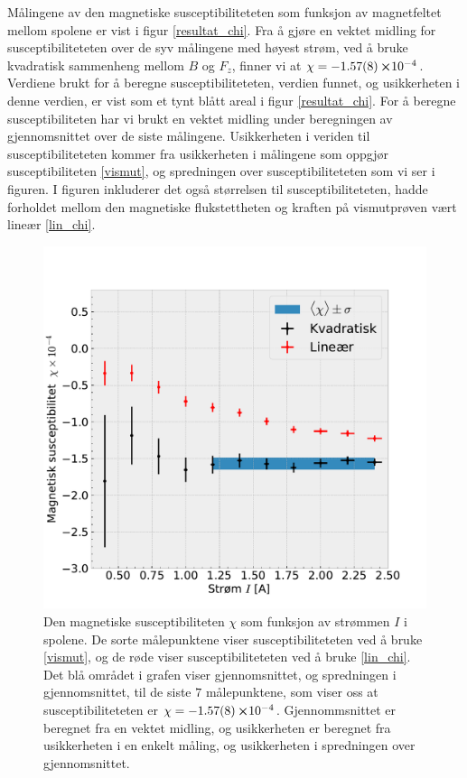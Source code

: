 \documentclass[%
 reprint,
 amsmath,amssymb,
 aps,
 norsk,
]{revtex4-1}
\begin{document}
Målingene av den magnetiske susceptibiliteteten som funksjon av magnetfeltet mellom spolene er vist i figur \vref{resultat_chi}. Fra å gjøre en vektet midling for susceptibiliteteten over de syv målingene med høyest strøm, ved å bruke kvadratisk sammenheng mellom $B$ og $F_z$, finner vi at $\chi = -\SI{1.57\pm0.08}\cross 10^{-4}$.
Verdiene brukt for å beregne susceptibiliteteten, verdien funnet, og usikkerheten i denne verdien, er vist som et tynt blått areal i figur \vref{resultat_chi}. For å beregne susceptibiliteten har vi brukt en vektet midling under beregningen av gjennomsnittet over de siste målingene. Usikkerheten i veriden til susceptibiliteteten kommer fra usikkerheten i målingene som oppgjør susceptibiliteten \eqref{vismut}, og spredningen over susceptibiliteteten som vi ser i figuren. I figuren inkluderer det også størrelsen til susceptibiliteteten, hadde forholdet mellom den magnetiske flukstettheten og kraften på vismutprøven vært lineær \eqref{lin_chi}.
\begin{figure}[h!]
  \centering
  \includegraphics[scale=0.45]{chi_effekt.pdf}
  \caption{Den magnetiske susceptibiliteten $\chi$ som funksjon av strømmen $I$ i spolene. De sorte målepunktene viser susceptibiliteteten ved å bruke \eqref{vismut}, og de røde viser susceptibiliteteten ved å bruke \eqref{lin_chi}. Det blå området i grafen viser gjennomsnittet, og spredningen i gjennomsnittet, til de siste $7$ målepunktene, som viser oss at susceptibiliteteten er $\chi = -\SI{1.57\pm0.08}\cross 10^{-4}$. Gjennommsnittet er beregnet fra en vektet midling, og usikkerheten er beregnet fra usikkerheten i en enkelt måling, og usikkerheten i spredningen over gjennomsnittet.}
  \label{resultat_chi}
\end{figure}
\end{document}
